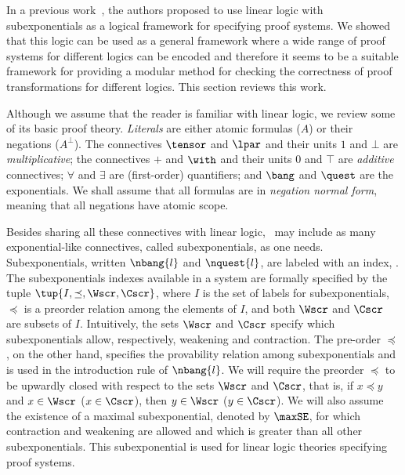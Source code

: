In a previous work~\cite{nigam11lsfa}, the authors proposed to use
linear logic with subexponentials as a
logical framework for specifying proof systems. We showed that this logic
can be used as a general framework where a wide range of
proof systems for different logics can be encoded and therefore it seems to
be a suitable framework for providing a modular method for checking the
correctness of proof transformations for different logics. This section 
reviews this work.

Although we assume that the reader is familiar with linear logic, we
review some of its basic proof theory. 
\emph{Literals} are either atomic formulas ($A$) or their
negations ($A^\bot$).  The connectives $\tensor$ and $\lpar$ and their
units $1$
and $\bot$ are \emph{multiplicative}; the connectives $\plus$ and
$\with$ and their units $0$ and $\top$ are \emph{additive}
connectives; $\forall$ and $\exists$ are (first-order) quantifiers;
and $\bang$ and $\quest$ are the exponentials.  We shall assume that
all formulas are in \emph{negation normal form}, meaning that all
negations have atomic scope.

Besides sharing all these connectives with linear logic, \sellf\ may
include as many exponential-like connectives, called
subexponentials, as one needs. Subexponentials, written
$\nbang{l}$ and $\nquest{l}$, are labeled with an index, . The
subexponentials indexes available in a
system are formally specified by the tuple 
$\tup{I, \preceq, \Wscr, \Cscr}$, where $I$ is the set of labels for
subexponentials, $\preceq$ is a preorder relation among the elements of
$I$, and both $\Wscr$ and $\Cscr$ are subsets of 
$I$.  Intuitively, the sets $\Wscr$ and $\Cscr$ specify which
subexponentials allow, respectively, weakening 
and contraction. The pre-order $\preceq$, on the other hand, specifies the
provability relation among subexponentials and is used in the introduction
rule of $\nbang{l}$. We will require the preorder $\preceq$ to be upwardly
closed with respect to the sets $\Wscr$ and $\Cscr$, that is, if $x \preceq
y$ and $x \in \Wscr$ ($x \in \Cscr$), then $y \in \Wscr$ ($y \in
\Cscr$).
 We will also assume  the existence of a maximal subexponential, denoted by
$\maxSE$, for which contraction and weakening are allowed and which is
greater than all other subexponentials. This subexponential is used for
linear logic theories specifying proof systems.


